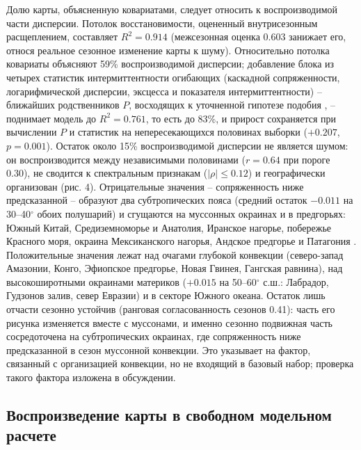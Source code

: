 \documentclass[12pt,a4paper]{article}
\begin{document}
Долю карты, объясненную ковариатами, следует относить к воспроизводимой части дисперсии. Потолок восстановимости, оцененный внутрисезонным расщеплением, составляет $R^2 = 0.914$ (межсезонная оценка 0.603 занижает его, относя реальное сезонное изменение карты к шуму). Относительно потолка ковариаты объясняют 59\% воспроизводимой дисперсии; добавление блока из четырех статистик интермиттентности огибающих (каскадной сопряженности, логарифмической дисперсии, эксцесса и показателя интермиттентности) -- ближайших родственников $P$, восходящих к уточненной гипотезе подобия \cite{Kolmogorov1962}, -- поднимает модель до $R^2 = 0.761$, то есть до 83\%, и прирост сохраняется при вычислении $P$ и статистик на непересекающихся половинах выборки ($+0.207$, $p = 0.001$). Остаток около 15\% воспроизводимой дисперсии не является шумом: он воспроизводится между независимыми половинами ($r = 0.64$ при пороге 0.30), не сводится к спектральным признакам ($|\rho| \le 0.12$) и географически организован (рис. 4). Отрицательные значения -- сопряженность ниже предсказанной -- образуют два субтропических пояса (средний остаток $-0.011$ на 30--40$^\circ$ обоих полушарий) и сгущаются на муссонных окраинах и в предгорьях: Южный Китай, Средиземноморье и Анатолия, Иранское нагорье, побережье Красного моря, окраина Мексиканского нагорья, Андское предгорье и Патагония \cite{RodwellHoskins1996}. Положительные значения лежат над очагами глубокой конвекции (северо-запад Амазонии, Конго, Эфиопское предгорье, Новая Гвинея, Гангская равнина), над высокоширотными окраинами материков ($+0.015$ на 50--60$^\circ$ с.ш.: Лабрадор, Гудзонов залив, север Евразии) и в секторе Южного океана. Остаток лишь отчасти сезонно устойчив (ранговая согласованность сезонов 0.41): часть его рисунка изменяется вместе с муссонами, и именно сезонно подвижная часть сосредоточена на субтропических окраинах, где сопряженность ниже предсказанной в сезон муссонной конвекции. Это указывает на фактор, связанный с организацией конвекции, но не входящий в базовый набор; проверка такого фактора изложена в обсуждении.

\subsection{Воспроизведение карты в свободном модельном расчете}
\end{document}
